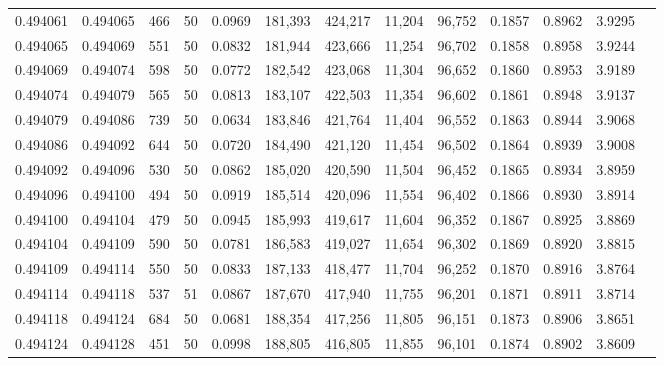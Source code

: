 \begin{tabular}{rrrrrrrrrrrrr}
0.494061 & 0.494065 &   466 &  50 &                                     0.0969 & 181,393 & 424,217 &  11,204 &  96,752 & 0.1857 & 0.8962 & 3.9295 \\
0.494065 & 0.494069 &   551 &  50 &                                     0.0832 & 181,944 & 423,666 &  11,254 &  96,702 & 0.1858 & 0.8958 & 3.9244 \\
0.494069 & 0.494074 &   598 &  50 &                                     0.0772 & 182,542 & 423,068 &  11,304 &  96,652 & 0.1860 & 0.8953 & 3.9189 \\
0.494074 & 0.494079 &   565 &  50 &                                     0.0813 & 183,107 & 422,503 &  11,354 &  96,602 & 0.1861 & 0.8948 & 3.9137 \\
0.494079 & 0.494086 &   739 &  50 &                                     0.0634 & 183,846 & 421,764 &  11,404 &  96,552 & 0.1863 & 0.8944 & 3.9068 \\
0.494086 & 0.494092 &   644 &  50 &                                     0.0720 & 184,490 & 421,120 &  11,454 &  96,502 & 0.1864 & 0.8939 & 3.9008 \\
0.494092 & 0.494096 &   530 &  50 &                                     0.0862 & 185,020 & 420,590 &  11,504 &  96,452 & 0.1865 & 0.8934 & 3.8959 \\
0.494096 & 0.494100 &   494 &  50 &                                     0.0919 & 185,514 & 420,096 &  11,554 &  96,402 & 0.1866 & 0.8930 & 3.8914 \\
0.494100 & 0.494104 &   479 &  50 &                                     0.0945 & 185,993 & 419,617 &  11,604 &  96,352 & 0.1867 & 0.8925 & 3.8869 \\
0.494104 & 0.494109 &   590 &  50 &                                     0.0781 & 186,583 & 419,027 &  11,654 &  96,302 & 0.1869 & 0.8920 & 3.8815 \\
0.494109 & 0.494114 &   550 &  50 &                                     0.0833 & 187,133 & 418,477 &  11,704 &  96,252 & 0.1870 & 0.8916 & 3.8764 \\
0.494114 & 0.494118 &   537 &  51 &                                     0.0867 & 187,670 & 417,940 &  11,755 &  96,201 & 0.1871 & 0.8911 & 3.8714 \\
0.494118 & 0.494124 &   684 &  50 &                                     0.0681 & 188,354 & 417,256 &  11,805 &  96,151 & 0.1873 & 0.8906 & 3.8651 \\
0.494124 & 0.494128 &   451 &  50 &                                     0.0998 & 188,805 & 416,805 &  11,855 &  96,101 & 0.1874 & 0.8902 & 3.8609 \\

\end{tabular}
